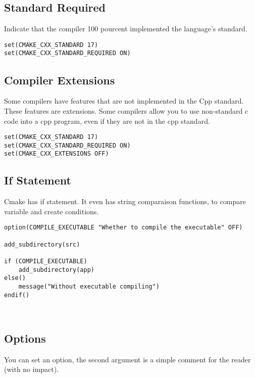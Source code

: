 \subsection{Standard Required}

Indicate that the compiler 100 pourcent implemented the language's standard.

\begin{verbatim}
set(CMAKE_CXX_STANDARD 17)
set(CMAKE_CXX_STANDARD_REQUIRED ON)
\end{verbatim}

\subsection{Compiler Extensions}

Some compilers have features that are not implemented in the Cpp standard. These features are extensions.
Some compilers allow you to use non-standard c code into a cpp program, even if they are not in the cpp standard.

\begin{verbatim}
set(CMAKE_CXX_STANDARD 17)
set(CMAKE_CXX_STANDARD_REQUIRED ON)
set(CMAKE_CXX_EXTENSIONS OFF)
\end{verbatim}

\subsection{If Statement}

Cmake has if statement. It even has string comparaison functions, to compare variable and create conditions.

\begin{verbatim}
option(COMPILE_EXECUTABLE "Whether to compile the executable" OFF)

add_subdirectory(src)

if (COMPILE_EXECUTABLE)
    add_subdirectory(app)
else()
    message("Without executable compiling")
endif()



\end{verbatim}


\subsection{Options}

You can set an option, the second argument is a simple comment for the reader (with no impact).


